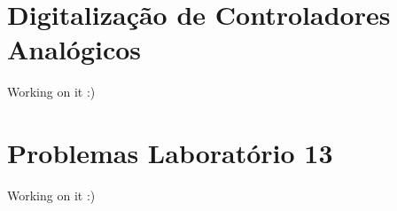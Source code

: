 \documentclass[
]{book}
\theoremstyle{definition}
\theoremstyle{definition}
\theoremstyle{definition}
\theoremstyle{remark}
\begin{document}
\hypertarget{digitalizauxe7uxe3o-de-controladores-analuxf3gicos}{%
\chapter{Digitalização de Controladores Analógicos}\label{digitalizauxe7uxe3o-de-controladores-analuxf3gicos}}

Working on it :)

\hypertarget{problemas-laboratuxf3rio-13}{%
\chapter*{Problemas Laboratório 13}\label{problemas-laboratuxf3rio-13}}

Working on it :)

  
\end{document}
